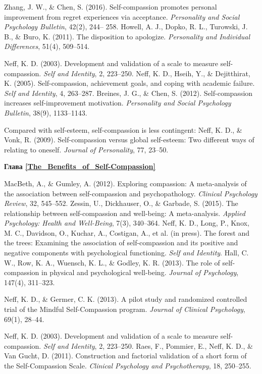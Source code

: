 \begin{thebibliography}{999}
	 Zhang, J. W., \& Chen, S. (2016). Self-compassion promotes personal improvement from regret experiences via acceptance. \textit{Personality and Social Psychology Bulletin}, 42(2), 244– 258.
	 Howell, A. J., Dopko, R. L., Turowski, J. B., \& Buro, K. (2011). The disposition to apologize. \textit{Personality and Individual Differences}, 51(4), 509–514.
	
	 Neff, K. D. (2003). Development and validation of a scale to measure self-compassion. \textit{Self and Identity}, 2, 223–250.
	 Neff, K. D., Hseih, Y., \& Dejitthirat, K. (2005). Self-compassion, achievement goals, and coping with academic failure. \textit{Self and Identity}, 4, 263–287.
	 Breines, J. G., \& Chen, S. (2012). Self-compassion increases self-improvement motivation. \textit{Personality and Social Psychology Bulletin}, 38(9), 1133–1143.
	
	 Compared with self-esteem, self-compassion is less contingent: Neff, K. D., \& Vonk, R. (2009). Self-compassion versus global self-esteem: Two different ways of relating to oneself. \textit{Journal of Personality}, 77, 23–50.
	
	
	\vspace{3ex}
	\textbf{Глава \ref{The_Benefits_of_Self-Compassion}}

	 MacBeth, A., \& Gumley, A. (2012). Exploring compassion: A meta-analysis of the association between self-compassion and psychopathology. \textit{Clinical Psychology Review}, 32, 545–552.
	 Zessin, U., Dickhauser, O., \& Garbade, S. (2015). The relationship between self-compassion and well-being: A meta-analysis. \textit{Applied Psychology: Health and Well-Being}, 7(3), 340–364.
	 Neff, K. D., Long, P., Knox, M. C., Davidson, O., Kuchar, A., Costigan, A., et al. (in press). The forest and the trees: Examining the association of self-compassion and its positive and negative components with psychological functioning. \textit{Self and Identity}.
	 Hall, C. W., Row, K. A., Wuensch, K. L., \& Godley, K. R. (2013). The role of self-compassion in physical and psychological well-being. \textit{Journal of Psychology}, 147(4), 311–323.
	
	 Neff, K. D., \& Germer, C. K. (2013). A pilot study and randomized controlled trial of the Mindful Self-Compassion program. \textit{Journal of Clinical Psychology}, 69(1), 28–44.
	
	 Neff, K. D. (2003). Development and validation of a scale to measure self-compassion. \textit{Self and Identity}, 2, 223–250.
	 Raes, F., Pommier, E., Neff, K. D., \& Van Gucht, D. (2011). Construction and factorial validation of a short form of the Self-Compassion Scale. \textit{Clinical Psychology and Psychotherapy}, 18, 250–255.
	

\end{thebibliography}
